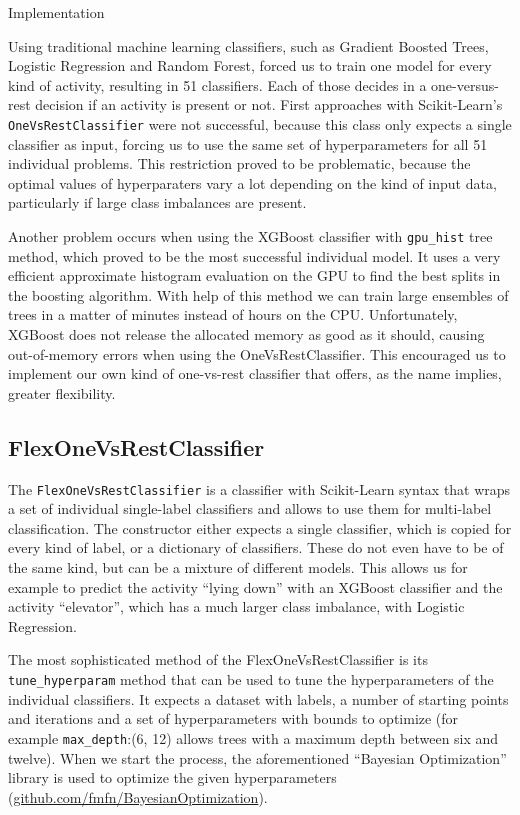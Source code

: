 \begin{section}{Implementation}



Using traditional machine learning classifiers, such as Gradient Boosted Trees, Logistic Regression and Random Forest, forced us to train one model for every kind of activity, resulting in 51 classifiers. Each of those decides in a one-versus-rest decision if an activity is present or not. 
First approaches with Scikit-Learn's \texttt{OneVsRestClassifier} were not successful, because this class only expects a single classifier as input, forcing us to use the same set of hyperparameters for all 51 individual problems. This restriction proved to be problematic, because the optimal values of hyperparaters vary a lot depending on the kind of input data, particularly if large class imbalances are present.

Another problem occurs when using the XGBoost classifier with \texttt{gpu\_hist} tree method, which proved to be the most successful individual model. It uses a very efficient approximate histogram evaluation on the GPU to find the best splits in the boosting algorithm. With help of this method we can train large ensembles of trees in a matter of minutes instead of hours on the CPU. Unfortunately, XGBoost does not release the allocated memory as good as it should, causing out-of-memory errors when using the OneVsRestClassifier.
This encouraged us to implement our own kind of one-vs-rest classifier that offers, as the name implies, greater flexibility. 

\subsection{FlexOneVsRestClassifier}

The \texttt{FlexOneVsRestClassifier} is a classifier with Scikit-Learn syntax that wraps a set of individual single-label classifiers and allows to use them for multi-label classification. The constructor either expects a single classifier, which is copied for every kind of label, or a dictionary of classifiers. These do not even have to be of the same kind, but can be a mixture of different models. This allows us for example to predict the activity \enquote{lying down} with an XGBoost classifier and the activity \enquote{elevator}, which has a much larger class imbalance, with Logistic Regression.

The most sophisticated method of the FlexOneVsRestClassifier is its \texttt{tune\_hyperparam} method that can be used to tune the hyperparameters of the individual classifiers. It expects a dataset with labels, a number of starting points and iterations and a set of hyperparameters with bounds to optimize (for example \texttt{max\_depth}:(6, 12) allows trees with a maximum depth between six and twelve). When we start the process, the aforementioned \enquote{Bayesian Optimization} library is used to optimize the given hyperparameters (\href{https://github.com/fmfn/BayesianOptimization}{github.com/fmfn/BayesianOptimization}). 


\end{section}

